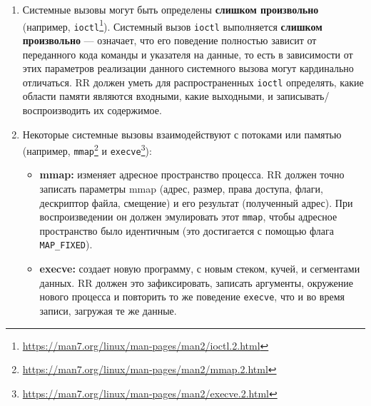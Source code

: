 \begin{enumerate}
  
  \item Системные вызовы могут быть определены \textbf{слишком произвольно}
  (например,
  \texttt{ioctl}\footnote{\url{https://man7.org/linux/man-pages/man2/ioctl.2.html}}).
  Системный вызов \texttt{ioctl} выполняется \textbf{слишком произвольно} ---
  означает, что его поведение полностью зависит от переданного кода команды и
  указателя на данные, то есть в зависимости от этих параметров реализации
  данного системного вызова могут кардинально отличаться. RR должен уметь для
  распространенных \texttt{ioctl} определять, какие области памяти являются
  входными, какие выходными, и записывать/воспроизводить их содержимое.

  \item Некоторые системные вызовы взаимодействуют с потоками или памятью
  (например,
  \texttt{mmap}\footnote{\url{https://man7.org/linux/man-pages/man2/mmap.2.html}}
  и
  \texttt{execve}\footnote{\url{https://man7.org/linux/man-pages/man2/execve.2.html}}):
  
  \begin{itemize}

    \item \textbf{mmap:} изменяет адресное пространство процесса. RR должен
    точно записать параметры mmap (адрес, размер, права доступа, флаги,
    дескриптор файла, смещение) и его результат (полученный адрес). При
    воспроизведении он должен эмулировать этот \texttt{mmap}, чтобы адресное
    пространство было идентичным (это достигается с помощью флага
    \texttt{MAP\_FIXED}).

    \item \textbf{execve:} создает новую программу, с новым стеком, кучей, и
    сегментами данных. RR должен это зафиксировать, записать аргументы,
    окружение нового процесса и повторить то же поведение \texttt{execve}, что
    и во время записи, загружая те же данные.

  \end{itemize}

\end{enumerate}




